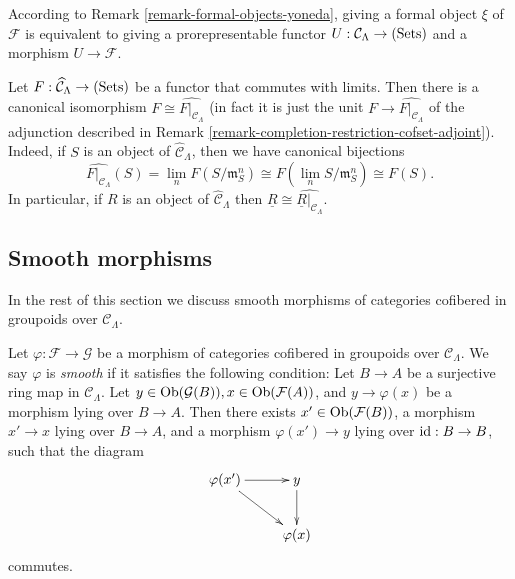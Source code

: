 \begin{remark}
According to Remark \ref{remark-formal-objects-yoneda}, giving a formal object 
$\xi$ of $\mathcal F$ is equivalent to giving a prorepresentable functor $U: 
\mathcal C_{\Lambda} \rightarrow \textnormal{(Sets)}$ and a morphism $U 
\rightarrow \mathcal{F}$. 
\end{remark}

\begin{remark}
\label{remark-restrict-complete-continuous-functor}
Let $F : \widehat{\mathcal C}_{\Lambda} \rightarrow \textnormal{(Sets)}$ be a 
functor that commutes with limits.  Then there is a canonical isomorphism $F 
\cong \widehat{F|_{\mathcal C_{\Lambda}}}$ (in fact it is just the unit $F 
\rightarrow \widehat{F|_{\mathcal C_{\Lambda}}}$ of the adjunction described in 
Remark \ref{remark-completion-restriction-cofset-adjoint}).  Indeed, if $S$ is 
an object of $\widehat{\mathcal C}_{\Lambda}$, then we have canonical bijections
\[ \widehat{F|_{\mathcal C_{\Lambda}}}(S) = \lim_{n} F(S/\mathfrak{m}_{S}^n) 
\cong F(\lim_{n} S/\mathfrak{m}_{S}^n) \cong F(S). \]
In particular, if $R$ is an object of $\widehat{\mathcal C}_{\Lambda}$ then 
$\underline{R} \cong \widehat{\underline{R}|_{\mathcal C_{\Lambda}}}$.
\end{remark}

\subsection{Smooth morphisms}
\noindent In the rest of this section we discuss smooth morphisms of categories 
cofibered in groupoids over $\mathcal C_{\Lambda}$.

\begin{definition}
\label{definition-smooth-morphism}
Let $\varphi: \mathcal F \rightarrow \mathcal G$ be a morphism of categories 
cofibered in groupoids over $\mathcal C_{\Lambda}$.  We say  $\varphi$ is 
\emph{smooth} if it satisfies the following condition: Let $B \rightarrow A$ be 
a surjective ring map in $\mathcal C_{\Lambda}$.  Let $y \in 
\textnormal{Ob}(\mathcal G(B)), x \in \textnormal{Ob}(\mathcal F(A))$, and $y 
\rightarrow \varphi(x)$ be a morphism lying over $B \rightarrow A$.  Then there 
exists $x' \in \textnormal{Ob}(\mathcal F(B))$, a morphism $x' \rightarrow x$ 
lying over $B \rightarrow A$, and a morphism $\varphi(x') \rightarrow y$ lying 
over $\textnormal{id}: B \rightarrow B$, such that the diagram
\[
\xymatrix{
\varphi(x') \ar[r] \ar[dr] & y \ar[d] \\
                        & \varphi(x)
}
\]
commutes.
\end{definition}

